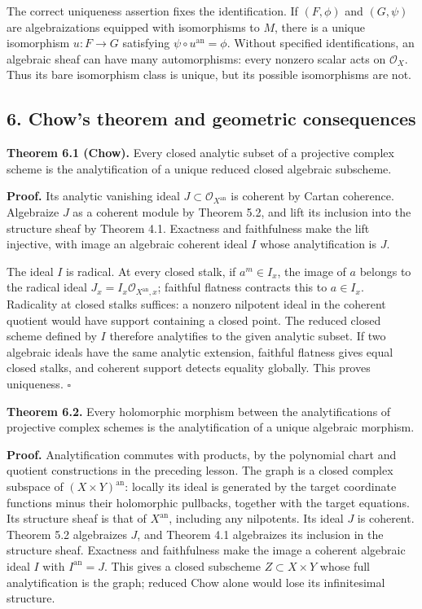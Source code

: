 \documentclass[11pt]{article}
\begin{document}
The correct uniqueness assertion fixes the identification. If
\((F,\phi)\) and \((G,\psi)\) are algebraizations equipped with
isomorphisms to \(M\), there is a unique isomorphism \(u:F\to G\)
satisfying \(\psi\circ u^{\mathrm{an}}=\phi\). Without specified
identifications, an algebraic sheaf can have many automorphisms: every
nonzero scalar acts on \(\mathcal O_X\). Thus its bare isomorphism class
is unique, but its possible isomorphisms are not.

\subsection{6. Chow's theorem and geometric
consequences}\label{chows-theorem-and-geometric-consequences}

\textbf{Theorem 6.1 (Chow).} Every closed analytic subset of a
projective complex scheme is the analytification of a unique reduced
closed algebraic subscheme.

\textbf{Proof.} Its analytic vanishing ideal
\(J\subset\mathcal O_{X^{\mathrm{an}}}\) is coherent by Cartan
coherence. Algebraize \(J\) as a coherent module by Theorem 5.2, and
lift its inclusion into the structure sheaf by Theorem 4.1. Exactness
and faithfulness make the lift injective, with image an algebraic
coherent ideal \(I\) whose analytification is \(J\).

The ideal \(I\) is radical. At every closed stalk, if \(a^m\in I_x\),
the image of \(a\) belongs to the radical ideal
\(J_x=I_x\mathcal O_{X^{\mathrm{an}},x}\); faithful flatness contracts
this to \(a\in I_x\). Radicality at closed stalks suffices: a nonzero
nilpotent ideal in the coherent quotient would have support containing a
closed point. The reduced closed scheme defined by \(I\) therefore
analytifies to the given analytic subset. If two algebraic ideals have
the same analytic extension, faithful flatness gives equal closed
stalks, and coherent support detects equality globally. This proves
uniqueness. \(\square\)

\textbf{Theorem 6.2.} Every holomorphic morphism between the
analytifications of projective complex schemes is the analytification of
a unique algebraic morphism.

\textbf{Proof.} Analytification commutes with products, by the
polynomial chart and quotient constructions in the preceding lesson. The
graph is a closed complex subspace of \((X\times Y)^{\mathrm{an}}\):
locally its ideal is generated by the target coordinate functions minus
their holomorphic pullbacks, together with the target equations. Its
structure sheaf is that of \(X^{\mathrm{an}}\), including any
nilpotents. Its ideal \(J\) is coherent. Theorem 5.2 algebraizes \(J\),
and Theorem 4.1 algebraizes its inclusion in the structure sheaf.
Exactness and faithfulness make the image a coherent algebraic ideal
\(I\) with \(I^{\mathrm{an}}=J\). This gives a closed subscheme
\(Z\subset X\times Y\) whose full analytification is the graph; reduced
Chow alone would lose its infinitesimal structure.
\end{document}
